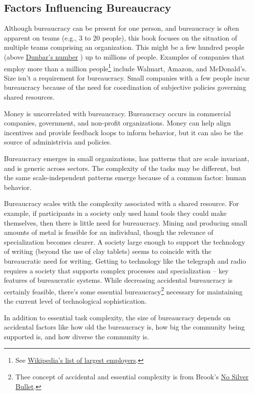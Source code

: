 \subsection*{Factors Influencing Bureaucracy}

Although bureaucracy can be present for one person, and bureaucracy is often apparent on teams (e.g., 3 to 20 people), this book focuses on the situation of multiple teams comprising an organization. This might be a few hundred people (above \href{https://en.wikipedia.org/wiki/Dunbar's_number}{Dunbar's number}
) up to millions of people. 
Examples of companies that employ more than a million people\footnote{See \href{https://en.wikipedia.org/wiki/List_of_largest_employers}{Wikipedia's list of largest employers}.
} include Walmart, Amazon, and McDonald's. Size isn't a requirement for bureaucracy. Small companies with a few people incur bureaucracy because of the need for coordination of subjective policies governing shared resources. 

Money is uncorrelated with bureaucracy. Bureaucracy occurs in commercial companies, government, and non-profit organizations. Money can help align incentives and provide feedback loops to inform behavior, but it can also be the source of administrivia and policies. 

Bureaucracy emerges in small organizations, has patterns that are scale invariant, and is generic across sectors. The complexity of the tasks may be different, but the same scale-independent patterns  emerge because of a common factor: human behavior.

Bureaucracy scales with the complexity associated with a shared resource. For example, if participants in a society only used hand tools they could make themselves, then there is little need for bureaucracy. Mining and producing small amounts of metal is feasible for an individual, though the relevance of specialization becomes clearer. A society large enough to support the technology of writing (beyond the use of clay tablets) seems to coincide with the bureaucratic need for writing. Getting to technology like the telegraph and radio requires a society that supports complex processes and specialization -- key features of bureaucratic systems. While decreasing accidental bureaucracy is certainly feasible, there's some essential bureaucracy\footnote{Thee concept of accidental and essential complexity is from Brook's \href{https://en.wikipedia.org/wiki/No_Silver_Bullet\#Summary}{No Silver Bullet}.
} necessary for maintaining the current level of technological sophistication. 


In addition to essential task complexity, the size of bureaucracy depends on accidental factors like how old the bureaucracy is, how big the community being supported is, and how diverse the community is.


